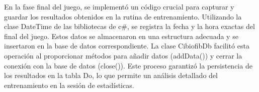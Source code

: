 En la fase final del juego, se implementó un código crucial para capturar y guardar los resultados obtenidos en la rutina de entrenamiento. Utilizando la clase DateTime de las bibliotecas de c\#, se registra la fecha y la hora exactas del final del juego. Estos datos se almacenaron en una estructura adecuada y se insertaron en la base de datos correspondiente. La clase CibiofibDb facilitó esta operación al proporcionar métodos para añadir datos (addData()) y cerrar la conexión con la base de datos (close()). Este proceso garantizó la persistencia de los resultados en la tabla Do, lo que permite un análisis detallado del entrenamiento en la sesión de estadísticas.